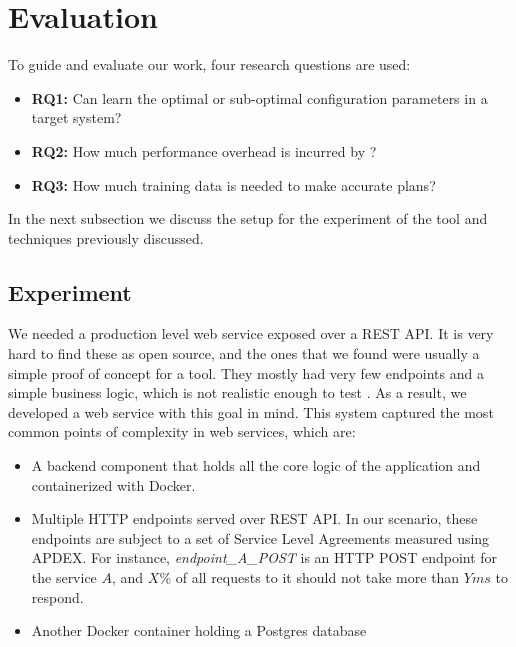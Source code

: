 

\section{Evaluation}

To guide and evaluate our work, four research questions are used:

\begin{itemize}
  \item \textbf{RQ1:} Can \projectname{} learn the optimal or sub-optimal configuration parameters in a target system?
  \item \textbf{RQ2:} How much performance overhead is incurred by \projectname{}?
  \item \textbf{RQ3:} How much training data is needed to make accurate plans?
\end{itemize}

In the next subsection we discuss the setup for the experiment of the tool and techniques previously discussed.

\subsection{Experiment}

We needed a production level web service exposed over a REST API. It is very hard to find these as open source, and the ones that we found were usually a simple proof of concept for a tool. They mostly had very few endpoints and a simple business logic, which is not realistic enough to test \projectname{}. As a result, we developed a web service with this goal in mind. This system captured the most common points of complexity in web services, which are:

\begin{itemize}
  \item A backend component that holds all the core logic of the application and containerized with Docker.
  \item Multiple HTTP endpoints served over REST API. In our scenario, these endpoints are subject to a set of Service Level Agreements measured using APDEX. For instance, \textit{endpoint\_A\_POST} is an HTTP POST endpoint for the service $A$, and $X\%$ of all requests to it should not take more than $Y ms$ to respond.
  \item Another Docker container holding a Postgres database
\end{itemize}

